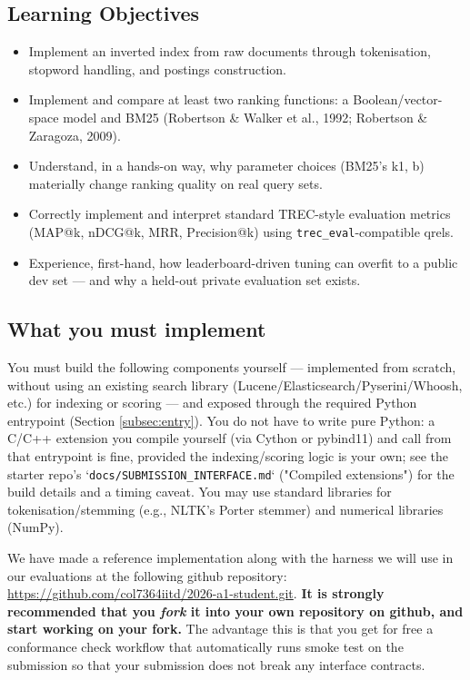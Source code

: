 \documentclass[10pt]{article}
\begin{document}
\subsection{Learning Objectives}
\begin{itemize}
\item Implement an inverted index from raw documents through tokenisation, stopword handling, and postings construction.
\item Implement and compare at least two ranking functions: a Boolean/vector-space model and BM25 (Robertson \& Walker et al., 1992; Robertson \& Zaragoza, 2009).
\item Understand, in a hands-on way, why parameter choices (BM25's k1, b) materially change ranking quality on real query sets.
\item Correctly implement and interpret standard TREC-style evaluation metrics (MAP@k, nDCG@k, MRR, Precision@k) using \texttt{trec\_eval}-compatible qrels.
\item Experience, first-hand, how leaderboard-driven tuning can overfit to a public dev set — and why a held-out private evaluation set exists.
\end{itemize}


\subsection{What you must implement}
You must build the following components yourself — implemented from scratch, without using an existing search library (Lucene/Elasticsearch/Pyserini/Whoosh, etc.) for indexing or scoring — and exposed through the required Python entrypoint (Section \ref{subsec:entry}). You do not have to write pure Python: a C/C++ extension you compile yourself (via Cython or pybind11) and call from that entrypoint is fine, provided the indexing/scoring logic is your own; see the starter repo's `\texttt{docs/SUBMISSION\_INTERFACE.md}` ("Compiled extensions") for the build details and a timing caveat. You may use standard libraries for tokenisation/stemming (e.g., NLTK's Porter stemmer) and numerical libraries (NumPy).

We have made a reference implementation along with the harness we will use in our evaluations at the following github repository: \url{https://github.com/col7364iitd/2026-a1-student.git}.
\textbf{It is strongly recommended that you {\it fork} it into your own repository on github, and start working on your fork.} The advantage this is that you get for free a conformance check workflow that automatically runs smoke test on the submission so that your submission does not break any interface contracts. 
\end{document}
